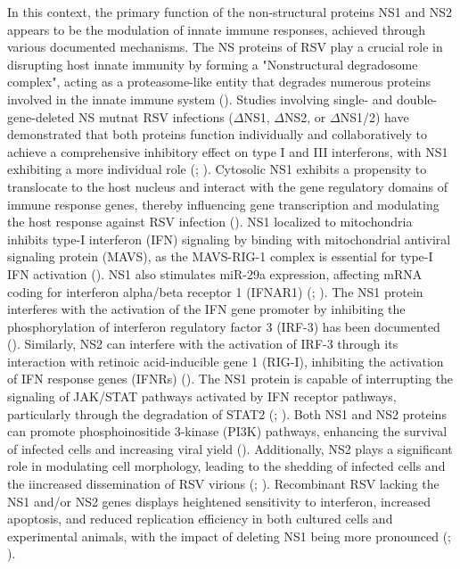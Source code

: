 In this context, the primary function of the non-structural proteins NS1 and NS2 appears to be the modulation of innate immune responses, achieved through various documented mechanisms. The NS proteins of RSV play a crucial role in disrupting host innate immunity by forming a "Nonstructural degradosome complex", acting as a proteasome-like entity that degrades numerous proteins involved in the innate immune system (\cite{Boyoglu-Barnum2019BiologyDevelopment}). Studies involving single- and double-gene-deleted NS mutnat RSV infections (\(\Delta\)NS1, \(\Delta\)NS2, or \(\Delta\)NS1/2) have demonstrated that both proteins function individually and collaboratively to achieve a comprehensive inhibitory effect on type I and III interferons, with NS1 exhibiting a more individual role (\cite{Sedeyn2019RespiratoryResponses}; \cite{Spann2004SuppressionMacrophages}). Cytosolic NS1 exhibits a propensity to translocate to the host nucleus and interact with the gene regulatory domains of immune response genes, thereby influencing gene transcription and modulating the host response against RSV infection (\cite{Pei2021Nuclear-localizedTranscription}). NS1 localized to mitochondria inhibits type-I interferon (IFN) signaling by binding with mitochondrial antiviral signaling protein (MAVS), as the MAVS-RIG-1 complex is essential for type-I IFN activation (\cite{Boyapalle2012RespiratoryInfection}). NS1 also stimulates miR-29a expression, affecting mRNA coding for interferon alpha/beta receptor 1 (IFNAR1) (\cite{Sedeyn2019RespiratoryResponses}; \cite{Zhang2016RespiratoryReceptor}). The NS1 protein interferes with the activation of the IFN gene promoter by inhibiting the phosphorylation of interferon regulatory factor 3 (IRF-3) has been documented (\cite{Spann2005EffectsCytokines}). Similarly, NS2 can interfere with the activation of IRF-3 through its interaction with retinoic acid-inducible gene 1 (RIG-I), inhibiting the activation of IFN response genes (IFNRs) (\cite{Wright2006TheHumans}). The NS1 protein is capable of interrupting the signaling of JAK/STAT pathways activated by IFN receptor pathways, particularly through the degradation of STAT2 (\cite{Wright2006TheHumans}; \cite{Sedeyn2019RespiratoryResponses}). Both NS1 and NS2 proteins can promote phosphoinositide 3-kinase (PI3K) pathways, enhancing the survival of infected cells and increasing viral yield (\cite{Wu2012TheBiology}). Additionally, NS2 plays a significant role in modulating cell morphology, leading to the shedding of infected cells and the iincreased dissemination of RSV virions (\cite{Sedeyn2019RespiratoryResponses}; \cite{Liesman2014RSV-encodedObstruction}). Recombinant RSV lacking the NS1 and/or NS2 genes displays heightened sensitivity to interferon, increased apoptosis, and reduced replication efficiency in both cultured cells and experimental animals, with the impact of deleting NS1 being more pronounced (\cite{Whitehead1999RecombinantChimpanzees}; \cite{Teng2000RecombinantChimpanzees.}).
